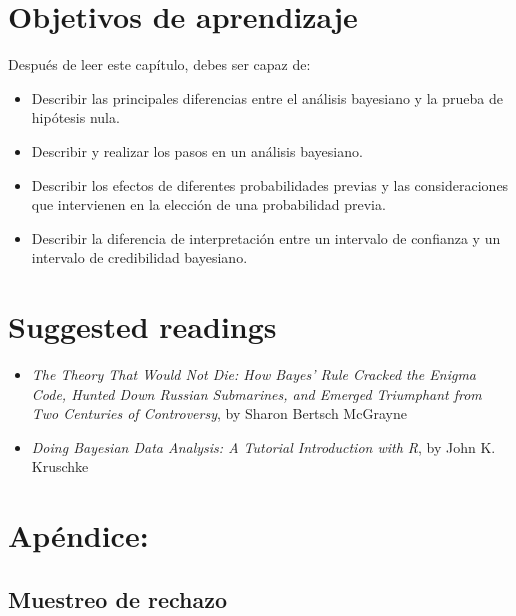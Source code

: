 \documentclass[
  12pt,
]{book}
\providecommand{\tightlist}{%
  \setlength{\itemsep}{0pt}\setlength{\parskip}{0pt}}
\begin{document}
\hypertarget{objetivos-de-aprendizaje}{%
\section{Objetivos de aprendizaje}\label{objetivos-de-aprendizaje}}

Después de leer este capítulo, debes ser capaz de:

\begin{itemize}
\tightlist
\item
  Describir las principales diferencias entre el análisis bayesiano y la prueba de hipótesis nula.
\item
  Describir y realizar los pasos en un análisis bayesiano.
\item
  Describir los efectos de diferentes probabilidades previas y las consideraciones que intervienen en la elección de una probabilidad previa.
\item
  Describir la diferencia de interpretación entre un intervalo de confianza y un intervalo de credibilidad bayesiano.
\end{itemize}

\hypertarget{suggested-readings}{%
\section{Suggested readings}\label{suggested-readings}}

\begin{itemize}
\tightlist
\item
  \emph{The Theory That Would Not Die: How Bayes' Rule Cracked the Enigma Code, Hunted Down Russian Submarines, and Emerged Triumphant from Two Centuries of Controversy}, by Sharon Bertsch McGrayne
\item
  \emph{Doing Bayesian Data Analysis: A Tutorial Introduction with R}, by John K. Kruschke
\end{itemize}

\hypertarget{apuxe9ndice}{%
\section{Apéndice:}\label{apuxe9ndice}}

\hypertarget{muestreo-de-rechazo}{%
\subsection{Muestreo de rechazo}\label{muestreo-de-rechazo}}
\end{document}
